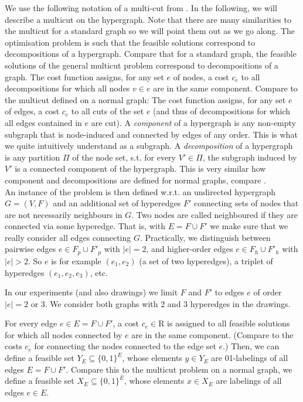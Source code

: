 We use the following notation of a multi-cut from \cite{Margret}. In the following, we will describe a multicut on the hypergraph. Note that there are many similarities to the multicut for a standard graph so we will point them out as we go along. The optimisation problem is such that the feasible solutions correspond to decompositions of a hypergraph. Compare that for a standard graph, the feasible solutions of the general multicut problem correspond to decompositions of a graph. 
The cost function assigns, for any set $e$ of nodes, a cost $c_e$ to all decompositions for which all nodes $v \in e$ are in the same component. 
Compare to the multicut defined on a normal graph: The cost function assigns, for any set $e$ of edges, a cost $c_e$ to all cuts of the set $e$ (and thus of decompositions for which all edges contained in $e$ are cut). 
A \textit{component} of a hypergraph is any non-empty subgraph that is node-induced and connected by edges of any order. This is what we quite intuitively understand as a subgraph. A \textit{decomposition} of a hypergraph is any partition $\Pi$ of the node set, s.t. for every $V' \in \Pi$, the subgraph induced by $V'$ is a connected component of the hypergraph. 
This is very similar how component and decompositions are defined for normal graphs, compare \cite{Andres}. \\
An instance of the problem is then defined w.r.t. an undirected hypergraph $G=(V,F)$ and an additional set of hyperedges $F'$ connecting sets of nodes that are not necessarily neighbours in $G$. Two nodes are called neighboured if they are connected via some hyperedge. That is, with $E=F \cup F'$ we make sure that we really consider all edges connecting $G$. 
Practically, we distinguish between pairwise edges $e \in F_p \cup F'_p$ with $|e|=2$, and higher-order edges $e \in F_h \cup F'_h$ with $|e| >2$. So $e$ is for example $(e_1, e_2)$ (a set of two hyperedges), a triplet of hyperedges $(e_1,e_2,e_3)$, etc.  

In our experiments (and also drawings) we limit $F$ and $F'$ to edges $e$ of order $|e|=2$ or 3. We consider both graphs with 2 and 3 hyperedges in the drawings. 

For every edge $e \in E=F \cup F'$, a cost $c_e \in \mathrm{R}$ is assigned to all feasible solutions for which all nodes connected by $e$ are in the same component. (Compare to the costs $c_e$ for connecting the nodes connected to the edge set $e$.) Then, we can define a feasible set $Y_E \subseteq \{0,1\}^E$, whose elements $y \in Y_E$ are 01-labelings of all edges $E=F \cup F'$. Compare this to the multicut problem on a normal graph, we define a feasible set $X_E \subseteq \{0,1\}^E$, whose elements $x \in X_E$ are labelings of all edges $e \in E$. 

